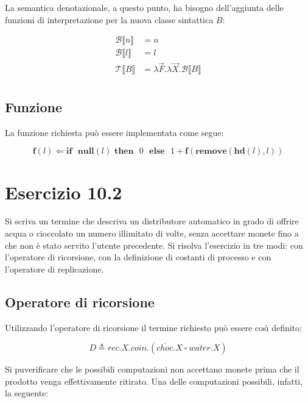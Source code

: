 		La semantica denotazionale, a questo punto, ha bisogno dell'aggiunta delle funzioni di interpretazione per la nuova classe sintattica $B$:
		
		\begin{align*}
		\mathcal{B} \llbracket n \rrbracket & = n\\
		\mathcal{B} \llbracket l \rrbracket & = l\\
		\mathcal{T} \llbracket B \rrbracket & = \lambda \overrightarrow{F}.\lambda \overrightarrow{X}.\mathcal{B} \llbracket B \rrbracket\\		
		\end{align*}
		
		\subsection{Funzione}
		\qquad La funzione richiesta pu\`o essere implementata come segue:
		
		$$\textbf{f}(l) \Leftarrow \textbf{if}\text{ }\textbf{null}(l)\text{
		}\textbf{then}\text{ }0\text{ }\textbf{else}\text{ }1 +
		\textbf{f}(\textbf{remove}(\textbf{hd}(l),l))$$
		
		\newpage
		
	\section{Esercizio 10.2}
		\qquad Si scriva un termine che descriva un distributore automatico in grado
		di offrire acqua o cioccolato un numero illimitato di volte, senza accettare
		monete fino a che non \`e stato servito l'utente precedente. Si risolva
		l'esercizio in tre modi: con l'operatore di ricorsione, con la definizione di
		costanti di processo e con l'operatore di replicazione.
		
		\sectionline
		
		\subsection{Operatore di ricorsione}
		
		\qquad Utilizzando l'operatore di ricorsione il termine richiesto pu\`{o} essere cos\`{\i} definito:
		
		$$D \triangleq rec.X.coin.(\overline{choc}.X\ \square \ \overline{water}.X)$$
		
		Si pu\oacc verificare che le possibili computazioni non accettano monete prima che il prodotto venga effettivamente ritirato. Una delle computazioni possibili, infatti, \eacc la seguente:
		
